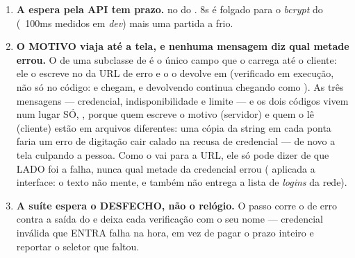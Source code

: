 \begin{enumerate}
  \item \textbf{A espera pela API tem prazo.}
     no  do . 8s é
    folgado para o \emph{bcrypt} do  (~100ms medidos em
    \emph{dev}) mais uma partida a frio.
  \item \textbf{O MOTIVO viaja até a tela, e nenhuma mensagem diz qual metade
    errou.} O  de uma subclasse de  é o único
    campo que o  carrega até o cliente: ele o escreve no
     da URL de erro e o  o devolve em
     (verificado em execução, não só no código:
     e  chegam, e
     devolvendo  continua chegando como
    ). As três mensagens --- credencial, indisponibilidade
    e limite --- e os dois códigos vivem num lugar SÓ,
    , porque quem escreve o motivo
    (servidor) e quem o lê (cliente) estão em arquivos diferentes: uma cópia da
    string em cada ponta faria um erro de digitação cair calado na recusa de
    credencial --- de novo a tela culpando a pessoa. Como o  vai para a
    URL, ele só pode dizer de que LADO foi a falha, nunca qual metade da
    credencial errou ( aplicada a interface: o texto não mente, e
    também não entrega a lista de \emph{logins} da rede).
  \item \textbf{A suíte espera o DESFECHO, não o relógio.} O passo corre o
     de erro contra a saída do  e deixa cada
    verificação com o seu nome --- credencial inválida que ENTRA falha na hora,
    em vez de pagar o prazo inteiro e reportar o seletor que faltou.
\end{enumerate}

